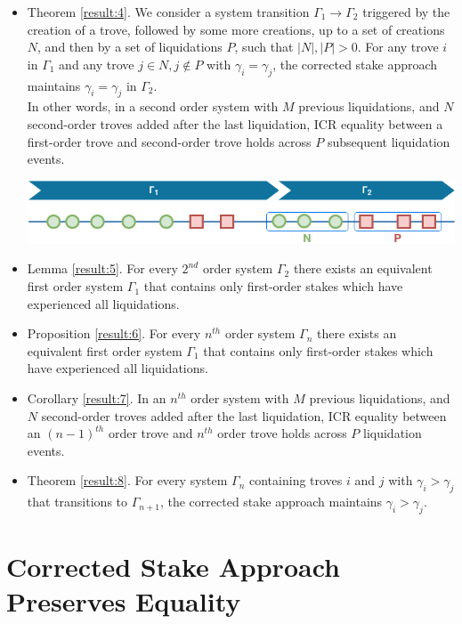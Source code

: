 \documentclass[reqno]{article}
\begin{document}
\begin{itemize}
  \item Theorem \ref{result:4}. We consider a system transition $\Gamma_1 \rightarrow \Gamma_2$ triggered by the creation of a trove, followed by some more creations, up to a set of creations $N$, and then by a set of liquidations $P$, such that $|N|, |P| > 0$. For any trove $i$ in $\Gamma_1$ and any trove $j \in N, j\notin P$ with $\gamma_i = \gamma_j$, the corrected stake approach maintains $\gamma_i = \gamma_j$ in $\Gamma_2$. \\
    In other words, in a second order system with $M$ previous liquidations, and $N$ second-order troves added after the last liquidation, ICR equality between a first-order trove and second-order trove holds across $P$ subsequent liquidation events.

    \includegraphics[width=\linewidth]{System_order_evolution_4.png}

  \item Lemma \ref{result:5}. For every $2^{nd}$ order system $\Gamma_2$ there exists an equivalent first order system $\Gamma_1$ that contains only first-order stakes which have experienced all liquidations.

  \item Proposition \ref{result:6}. For every $n^{th}$ order system $\Gamma_n$ there exists an equivalent first order system $\Gamma_1$ that contains only first-order stakes which have experienced all liquidations.

  \item Corollary \ref{result:7}. In an $n^{th}$ order system with $M$ previous liquidations, and $N$ second-order troves added after the last liquidation, ICR equality between an $(n-1)^{th}$ order trove and $n^{th}$ order trove holds across $P$ liquidation events.

  \item Theorem \ref{result:8}. For every system $\Gamma_n$ containing troves $i$ and $j$ with $\gamma_i > \gamma_j$ that transitions to $\Gamma_{n+1}$, the corrected stake approach maintains $\gamma_i > \gamma_j$.
\end{itemize}


\section{Corrected Stake Approach Preserves Equality}
\end{document}
